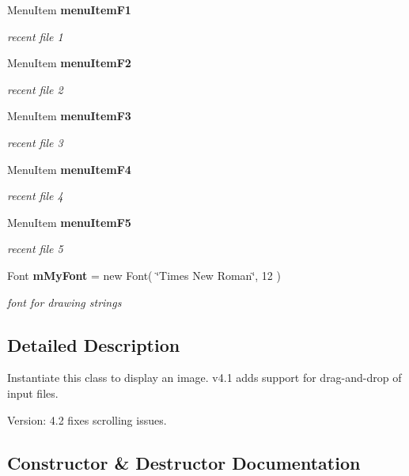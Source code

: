 \begin{CompactItemize}
Menu\-Item {\bf menu\-Item\-F1}
\begin{CompactList}\small\item\em recent file 1 \item\end{CompactList}\item 
Menu\-Item {\bf menu\-Item\-F2}
\begin{CompactList}\small\item\em recent file 2 \item\end{CompactList}\item 
Menu\-Item {\bf menu\-Item\-F3}
\begin{CompactList}\small\item\em recent file 3 \item\end{CompactList}\item 
Menu\-Item {\bf menu\-Item\-F4}
\begin{CompactList}\small\item\em recent file 4 \item\end{CompactList}\item 
Menu\-Item {\bf menu\-Item\-F5}
\begin{CompactList}\small\item\em recent file 5 \item\end{CompactList}\item 
Font {\bf m\-My\-Font} = new Font( \char`\"{}Times New Roman\char`\"{}, 12 )
\begin{CompactList}\small\item\em font for drawing strings \item\end{CompactList}\end{CompactItemize}


\subsection{Detailed Description}
Instantiate this class to display an image. v4.1 adds support for drag-and-drop of input files. 

\begin{Desc}
\item[Version:]4.2 fixes scrolling issues. \end{Desc}




\subsection{Constructor \& Destructor Documentation}
